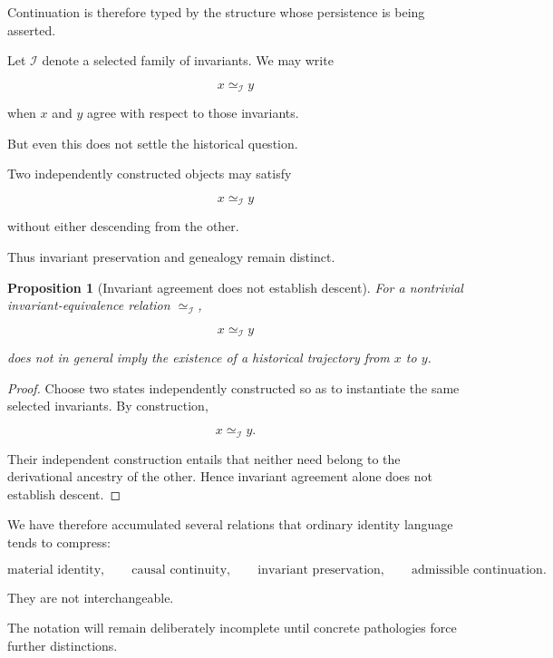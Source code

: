 \documentclass[
  11pt,
  a4paper,
  DIV=12,
  BCOR=0mm,
  parskip=half-
]{scrartcl}
\newcommand{\Inv}{\mathcal I}
\newcommand{\simI}{\simeq_{\Inv}}
\theoremstyle{definition}
\theoremstyle{plain}
\newtheorem{proposition}[definition]{Proposition}
\theoremstyle{remark}
\begin{document}
Continuation is therefore typed by the structure whose persistence is being
asserted.

Let \(\Inv\) denote a selected family of invariants. We may write

\[
  x\simI y
\]

when \(x\) and \(y\) agree with respect to those invariants.

But even this does not settle the historical question.

Two independently constructed objects may satisfy

\[
  x\simI y
\]

without either descending from the other.

Thus invariant preservation and genealogy remain distinct.

\begin{proposition}[Invariant agreement does not establish descent]
\label{prop:invariant-not-descent}
For a nontrivial invariant-equivalence relation \(\simI\),

\[
  x\simI y
\]

does not in general imply the existence of a historical trajectory from
\(x\) to \(y\).
\end{proposition}

\begin{proof}
Choose two states independently constructed so as to instantiate the same
selected invariants. By construction,

\[
  x\simI y.
\]

Their independent construction entails that neither need belong to the
derivational ancestry of the other. Hence invariant agreement alone does not
establish descent.
\end{proof}

We have therefore accumulated several relations that ordinary identity
language tends to compress:

\[
  \text{material identity},
  \qquad
  \text{causal continuity},
  \qquad
  \text{invariant preservation},
  \qquad
  \text{admissible continuation}.
\]

They are not interchangeable.

The notation will remain deliberately incomplete until concrete pathologies
force further distinctions.

\end{document}

